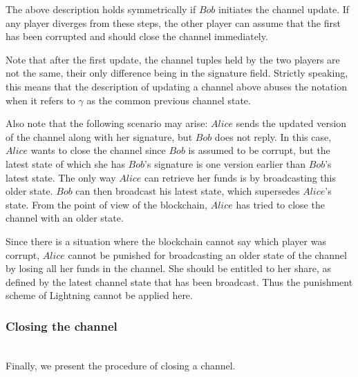   The above description holds symmetrically if $Bob$ initiates the channel update. If any
  player diverges from these steps, the other player can assume that the first has been
  corrupted and should close the channel immediately.

  Note that after the first update, the channel tuples held by the two players are not the
  same, their only difference being in the signature field. Strictly speaking, this means
  that the description of updating a channel above abuses the notation when it refers to
  $\gamma$ as the common previous channel state.

  Also note that the following scenario may arise: $Alice$ sends the updated version of
  the channel along with her signature, but $Bob$ does not reply. In this case, $Alice$
  wants to close the channel since $Bob$ is assumed to be corrupt, but the latest state of
  which she has $Bob$'s signature is one version earlier than $Bob$'s latest state.  The
  only way $Alice$ can retrieve her funds is by broadcasting this older state. $Bob$ can
  then broadcast his latest state, which supersedes $Alice$'s state. From the point of
  view of the blockchain, $Alice$ has tried to close the channel with an older state.

  Since there is a situation where the blockchain cannot say which player was corrupt,
  $Alice$ cannot be punished for broadcasting an older state of the channel by losing all
  her funds in the channel. She should be entitled to her share, as defined by the latest
  channel state that has been broadcast. Thus the punishment scheme of Lightning cannot be
  applied here.

  \subsubsection{Closing the channel} \ \\

  Finally, we present the procedure of closing a channel.

